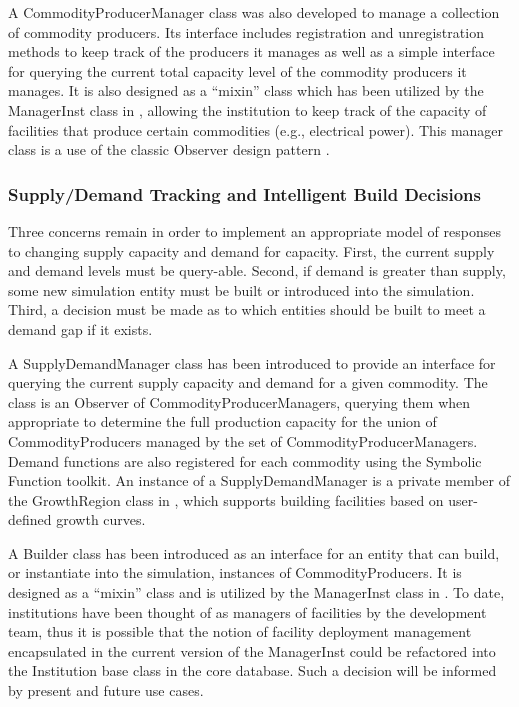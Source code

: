 A CommodityProducerManager class was also developed to manage a collection of
commodity producers. Its interface includes registration and unregistration
methods to keep track of the producers it manages as well as a simple interface
for querying the current total capacity level of the commodity producers it
manages. It is also designed as a ``mixin'' class which has been utilized by the
ManagerInst class in \Cycamore, allowing the institution to keep track of the
capacity of facilities that produce certain commodities (e.g., electrical
power). This manager class is a use of the classic Observer design pattern
\cite{vlissides_design_1995}.

\subsubsection{Supply/Demand Tracking and Intelligent Build Decisions}

Three concerns remain in order to implement an appropriate model of responses to
changing supply capacity and demand for capacity. First, the current supply and
demand levels must be query-able. Second, if demand is greater than supply, some
new simulation entity must be built or introduced into the simulation. Third, a
decision must be made as to which entities should be built to meet a demand gap
if it exists.

A SupplyDemandManager class has been introduced to provide an interface for
querying the current supply capacity and demand for a given commodity. The class
is an Observer of CommodityProducerManagers, querying them when appropriate to
determine the full production capacity for the union of CommodityProducers
managed by the set of CommodityProducerManagers. Demand functions are also
registered for each commodity using the Symbolic Function toolkit. An instance
of a SupplyDemandManager is a private member of the GrowthRegion class in
\Cycamore, which supports building facilities based on user-defined growth
curves.

A Builder class has been introduced as an interface for an entity that can
build, or instantiate into the simulation, instances of CommodityProducers. It
is designed as a ``mixin'' class and is utilized by the ManagerInst class in
\Cycamore. To date, institutions have been thought of as managers of facilities
by the \Cyclus development team, thus it is possible that the notion of facility
deployment management encapsulated in the current version of the ManagerInst
could be refactored into the Institution base class in the \Cyclus core
database. Such a decision will be informed by present and future use cases.

